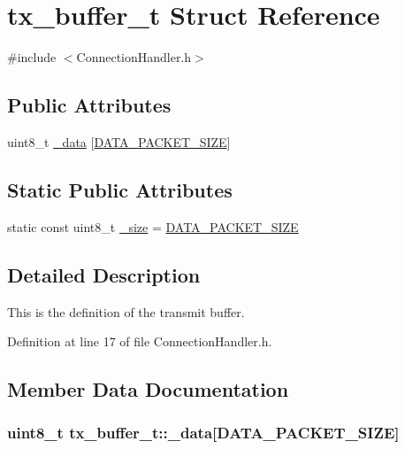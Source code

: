 \hypertarget{structtx__buffer__t}{\section{tx\-\_\-buffer\-\_\-t \-Struct \-Reference}
\label{structtx__buffer__t}
}


{\ttfamily \#include $<$\-Connection\-Handler.\-h$>$}

\subsection*{\-Public \-Attributes}
\begin{DoxyCompactItemize}
\item 
uint8\-\_\-t \hyperlink{structtx__buffer__t_a545951c29819cad4571effcc850bbc08}{\-\_\-data} \mbox{[}\hyperlink{_a_d_s1298_driver_8h_abb59a566539e5e148f63599ee6e67ea1}{\-D\-A\-T\-A\-\_\-\-P\-A\-C\-K\-E\-T\-\_\-\-S\-I\-Z\-E}\mbox{]}
\end{DoxyCompactItemize}
\subsection*{\-Static \-Public \-Attributes}
\begin{DoxyCompactItemize}
\item 
static const uint8\-\_\-t \hyperlink{structtx__buffer__t_a9e50e47b9d21ef81014e8325acc2bb3f}{\-\_\-size} = \hyperlink{_a_d_s1298_driver_8h_abb59a566539e5e148f63599ee6e67ea1}{\-D\-A\-T\-A\-\_\-\-P\-A\-C\-K\-E\-T\-\_\-\-S\-I\-Z\-E}
\end{DoxyCompactItemize}


\subsection{\-Detailed \-Description}
\-This is the definition of the transmit buffer. 

\-Definition at line 17 of file \-Connection\-Handler.\-h.



\subsection{\-Member \-Data \-Documentation}
\hypertarget{structtx__buffer__t_a545951c29819cad4571effcc850bbc08}{
\subsubsection[{\-\_\-data}]{\setlength{\rightskip}{0pt plus 5cm}uint8\-\_\-t {\bf tx\-\_\-buffer\-\_\-t\-::\-\_\-data}\mbox{[}{\bf \-D\-A\-T\-A\-\_\-\-P\-A\-C\-K\-E\-T\-\_\-\-S\-I\-Z\-E}\mbox{]}}}\label{structtx__buffer__t_a545951c29819cad4571effcc850bbc08}


